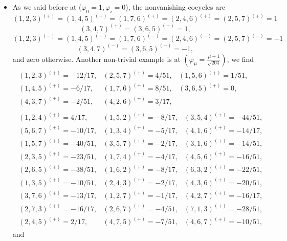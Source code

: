 \documentclass[a4paper,12pt]{book}
\begin{document}
\begin{itemize}
\item  As we said before at ($\varphi _{0}=1,\varphi _{i}=0$), the
nonvanishing cocycles are 
\[
(1,2,3)^{(+)}=(1,4,5)^{(+)}=(1,7,6)^{(+)}=(2,4,6)^{(+)}=(2,5,7)^{(+)}=1 
\]
\begin{equation}
(3,4,7)^{(+)}=(3,6,5)^{(+)}=1,
\end{equation}
\[
(1,2,3)^{(-)}=(1,4,5)^{(-)}=(1,7,6)^{(-)}=(2,4,6)^{(-)}=(2,5,7)^{(-)}=-1 
\]
\begin{equation}
(3,4,7)^{(-)}=(3,6,5)^{(-)}=-1,
\end{equation}
and zero otherwise. Another non-trivial example is at $\left( \varphi _{\mu
}=\frac{\mu +1}{\sqrt{204}}\right) $, we find 
\begin{equation}
\begin{array}{c}
\begin{array}{lll}
(1,2,3)^{(+)}=-12/17, & (2,5,7)^{(+)}=4/51, & (1,5,6)^{(+)}=1/51, \\ 
(1,4,5)^{(+)}=-6/17, & (1,7,6)^{(+)}=8/51, & (3,6,5)^{(+)}=0, \\ 
(4,3,7)^{(+)}=-2/51, & (4,2,6)^{(+)}=3/17, & 
\end{array}
\\ 
\begin{array}{lll}
(1,2,4)^{(+)}=4/17, & (1,5,2)^{(+)}=-8/17, & (3,5,4)^{(+)}=-44/51, \\ 
(5,6,7)^{(+)}=-10/17, & (1,3,4)^{(+)}=-5/17, & (4,1,6)^{(+)}=-14/17, \\ 
(1,5,7)^{(+)}=-40/51, & (3,5,7)^{(+)}=-2/17, & (3,1,6)^{(+)}=-14/51, \\ 
(2,3,5)^{(+)}=-23/51, & (1,7,4)^{(+)}=-4/17, & (4,5,6)^{(+)}=-16/51, \\ 
(2,6,5)^{(+)}=-38/51, & (1,6,2)^{(+)}=-8/17, & (6,3,2)^{(+)}=-22/51, \\ 
(1,3,5)^{(+)}=-10/51, & (2,4,3)^{(+)}=-2/17, & (4,3,6)^{(+)}=-20/51, \\ 
(3,7,6)^{(+)}=-13/17, & (1,2,7)^{(+)}=-1/17, & (4,2,7)^{(+)}=-16/17, \\ 
(2,7,3)^{(+)}=-16/17, & (2,6,7)^{(+)}=-4/51, & (7,1,3)^{(+)}=-28/51, \\ 
(2,4,5)^{(+)}=2/17, & (4,7,5)^{(+)}=-7/51, & (4,6,7)^{(+)}=-10/51,
\end{array}
\end{array}
\label{xxx1}
\end{equation}
and 
\begin{equation}
\begin{array}{c}

\end{array}
\end{equation}
\end{itemize}
\end{document}
